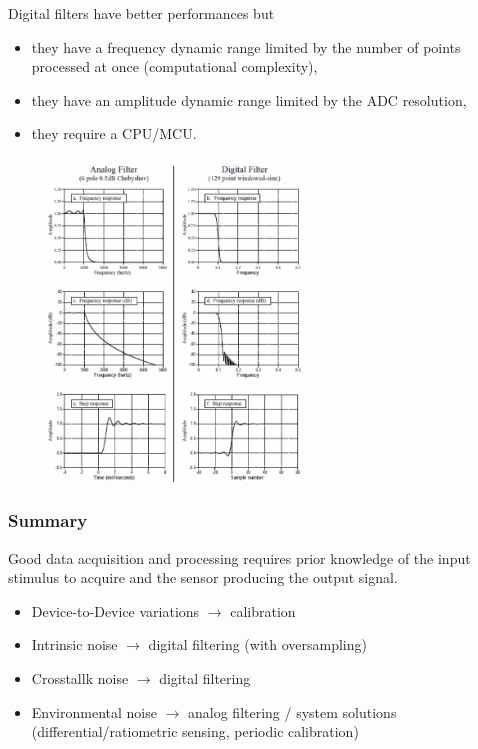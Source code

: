\begin{minipage}{0.5 \linewidth}
Digital filters have better
performances but
\begin{itemize}
\item they have a frequency
dynamic range limited
by the number of points
processed at once
(computational
complexity),
\item they have an amplitude
dynamic range limited
by the ADC resolution,
\item they require a CPU/MCU.
\end{itemize}
\end{minipage}\hfill
\begin{minipage}{0.5 \linewidth}
\begin{figure}[H]
    \centering
    \includegraphics[width = 0.6\textwidth]{L6/img/analogvsdigital.PNG}
\end{figure}
\end{minipage}


\subsubsection{Summary}

Good data acquisition and processing requires prior
knowledge of the input stimulus to acquire and the
sensor producing the output signal.
\begin{itemize}
\item Device-to-Device variations $\rightarrow$ calibration
\item Intrinsic noise $\rightarrow$ digital filtering (with oversampling)
\item Crosstallk noise $\rightarrow$ digital filtering
\item Environmental noise $\rightarrow$ analog filtering / system solutions
(differential/ratiometric sensing, periodic calibration)
\end{itemize}


